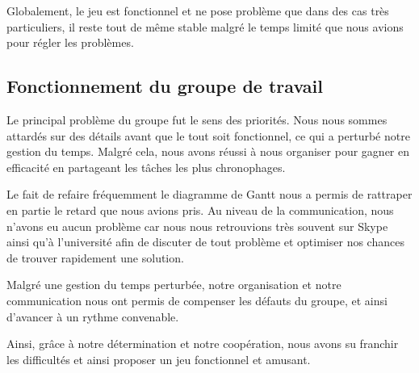 Globalement, le jeu est fonctionnel et ne pose problème que dans des
cas très particuliers, il reste tout de même stable malgré le temps
limité que nous avions pour régler les problèmes.

\subsection{Fonctionnement du groupe de travail}

Le principal problème du groupe fut le sens des priorités. Nous nous sommes
attardés sur des détails avant que le tout soit fonctionnel, ce qui a
perturbé notre gestion du temps. Malgré cela, nous avons réussi à nous
organiser pour gagner en efficacité en partageant les tâches les plus
chronophages.

Le fait de refaire fréquemment le diagramme de Gantt nous a permis de
rattraper en partie le retard que nous avions pris. Au niveau de la
communication, nous n'avons eu aucun problème car nous nous
retrouvions très souvent sur Skype ainsi qu'à l'université afin
de discuter de tout problème et optimiser nos chances de trouver
rapidement une solution.

Malgré une gestion du temps perturbée, notre organisation et notre
communication nous ont permis de compenser les défauts du groupe,
et ainsi d'avancer à un rythme convenable.

Ainsi, grâce à notre détermination et notre coopération, nous avons
su franchir les difficultés et ainsi proposer un jeu fonctionnel et amusant.
